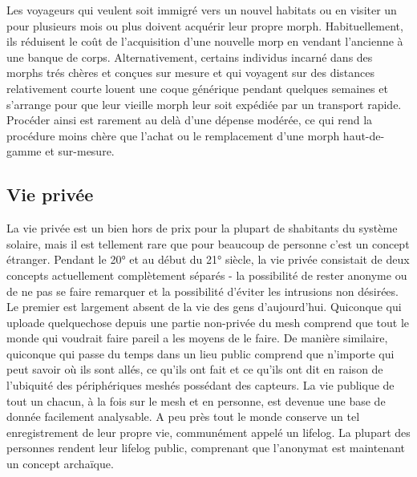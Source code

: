             Les voyageurs qui veulent soit immigré vers un nouvel habitats ou en visiter un pour plusieurs mois ou plus doivent acquérir leur propre morph. Habituellement, ils réduisent le coût de l'acquisition d'une nouvelle morp en vendant l'ancienne à une banque de corps. Alternativement, certains individus incarné dans des morphs trés chères et conçues sur mesure et qui voyagent sur des distances relativement courte louent une coque générique pendant quelques semaines et s'arrange pour que leur vieille morph leur soit expédiée par un transport rapide. Procéder ainsi est rarement au delà d'une dépense modérée, ce qui rend la procédure moins chère que l'achat ou le remplacement d'une morph haut-de-gamme et sur-mesure. 

            \subsection{Vie privée} \label{sec:privacy} 

            La vie privée est un bien hors de prix pour la plupart de shabitants du système solaire, mais il est tellement rare que pour beaucoup de personne c'est un concept étranger. Pendant le 20° et au début du 21° siècle, la vie privée consistait de deux concepts actuellement complètement séparés - la possibilité de rester anonyme ou de ne pas se faire remarquer et la possibilité d'éviter les intrusions non désirées. Le premier est largement absent de la vie des gens d'aujourd'hui. Quiconque qui uploade quelquechose depuis une partie non-privée du mesh comprend que tout le monde qui voudrait faire pareil a les moyens de le faire. De manière similaire, quiconque qui passe du temps dans un lieu public comprend que n'importe qui peut savoir où ils sont allés, ce qu'ils ont fait et ce qu'ils ont dit en raison de l'ubiquité des périphériques meshés possédant des capteurs. La vie publique de tout un chacun, à la fois sur le mesh et en personne, est devenue une base de donnée facilement analysable. A peu près tout le monde conserve un tel enregistrement de leur propre vie, communément appelé un lifelog. La plupart des personnes rendent leur lifelog public, comprenant que l'anonymat est maintenant un concept archaïque. 

